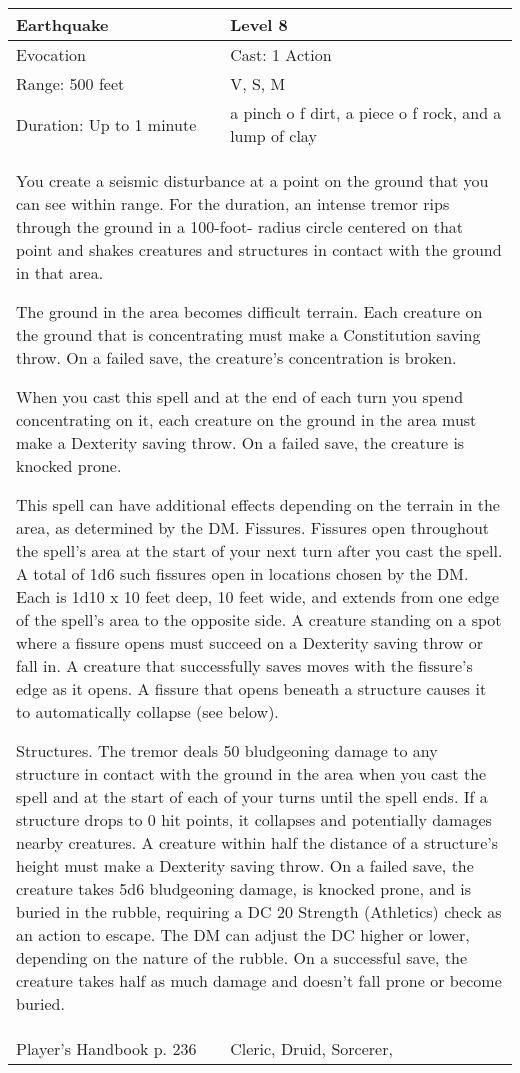 \documentclass[11pt]{report}
\begin{document}
\begin{table}[H]
	\begin{tabular}{||p{6cm}|p{6cm}||}
		\hline\hline
		\bf{Earthquake} & Level 8\\ \hline
		Evocation & Cast: 1 Action\\ \hline
		Range: 500 feet & V, S, M\\ \hline
		Duration: Up to 1 minute & a pinch o f dirt, a piece o f rock, and a lump of clay\\ \hline
		\multicolumn{2}{||p{12cm}||}{You create a seismic disturbance at a point on the ground that you can see within range. 
For the duration, an intense tremor rips through the ground in a 100-foot- radius circle centered on that point and shakes creatures and structures in contact with the ground in that area. 

The ground in the area becomes difficult terrain. Each creature on the ground that is concentrating must make a Constitution saving throw. On a failed save, the creature’s concentration is broken. 

When you cast this spell and at the end of each turn you spend concentrating on it, each creature on the ground in the area must make a Dexterity saving throw. On a failed save, the creature is knocked prone. 

This spell can have additional effects depending on the terrain in the area, as determined by the DM. 
Fissures. 
Fissures open throughout the spell’s area at the start of your next turn after you cast the spell. A total of 1d6 such fissures open in locations chosen by the DM. Each is 1d10 x 10 feet deep, 10 feet wide, and extends from one edge of the spell’s area to the opposite side. A creature standing on a spot where a fissure opens must succeed on a Dexterity saving throw or fall in. A creature that successfully saves moves with the fissure’s edge as it opens. 
A fissure that opens beneath a structure causes it to automatically collapse (see below). 

Structures. 
The tremor deals 50 bludgeoning damage to any structure in contact with the ground in the area when you cast the spell and at the start of each of your turns until the spell ends. If a structure drops to 0 hit points, it collapses and potentially damages nearby creatures. A creature within half the distance of a structure’s height must make a Dexterity saving throw. On a failed save, the creature takes 5d6 bludgeoning damage, is knocked prone, and is buried in the rubble, requiring a DC 20 Strength (Athletics) check as an action to escape. The DM can adjust the DC higher or lower, depending on the nature of the rubble. On a successful save, the creature takes half as much damage and doesn’t fall prone or become buried.}\\ \hline
Player's Handbook p. 236 & Cleric, Druid, Sorcerer, \\ \hline\hline
	\end{tabular}
\end{table}
\end{document}
